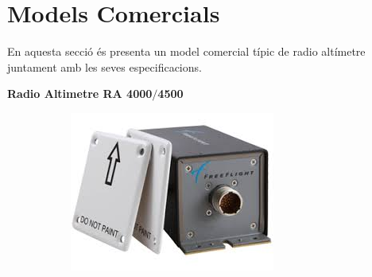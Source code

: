 \section{Models Comercials}

En aquesta secció és presenta un model comercial típic de radio altímetre juntament amb les seves especificacions.

\textbf{Radio Altimetre RA 4000$/$4500}

	\begin{figure}[H]
	\centering
	  \begin{subfigure}[b]{0.32\textwidth}
	  \includegraphics[width=\textwidth]{./images/RA4000.png}
	  \caption{}
	  \label{1diag1}
	  \end{subfigure}
	  \qquad %
	  \begin{subfigure}[b]{0.4\textwidth}

\end{subfigure}
\end{figure}
